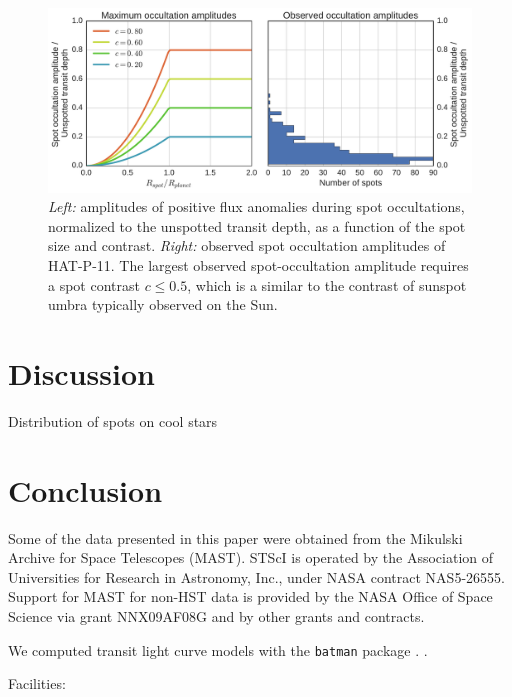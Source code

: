 \documentclass[iop]{emulateapj}
\begin{document}
\begin{figure}
\centering
\includegraphics[scale=0.3]{figures/contrasts.pdf}
\caption{\textit{Left:} amplitudes of positive flux anomalies during spot occultations, normalized to the unspotted transit depth, as a function of the spot size and contrast. \textit{Right:} observed spot occultation amplitudes of HAT-P-11. The largest observed spot-occultation amplitude requires a spot contrast $c \le 0.5$, which is a similar to the contrast of sunspot umbra typically observed on the Sun.}
\label{fig:contrast}
\end{figure}


\section{Discussion}

Distribution of spots on cool stars \citep{Schuessler1996, Granzer2000}

\section{Conclusion}


\acknowledgments

Some of the data presented in this paper were obtained from the Mikulski Archive for Space Telescopes (MAST). STScI is operated by the Association of Universities for Research in Astronomy, Inc., under NASA contract NAS5-26555. Support for MAST for non-HST data is provided by the NASA Office of Space Science via grant NNX09AF08G and by other grants and contracts.

We computed transit light curve models with the \texttt{batman} package \citep{Kreidberg2015}. \citep{gatspy}. 

Facilities: 


\end{document}

